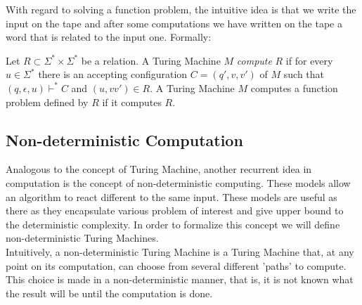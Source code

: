   With regard to solving a function problem, the intuitive idea is that we write the input on the tape and after some computations we have written on the tape a word that is related to the input one. Formally:


  \begin{definition}
    Let $R\subset\Sigma^*\times \Sigma^*$ be a relation. A Turing Machine $M$ \emph{compute} $R$ if for every $u\in \Sigma^*$ there is an accepting configuration $C=(q',v,v')$ of $M$  such that $(q,\epsilon,u)\vdash^* C$ and $(u,vv') \in R$. A Turing Machine $M$ computes a function problem defined by $R$ if it computes $R$.
  \end{definition}


  

  \subsection{Non-deterministic Computation}
Analogous to the concept of Turing Machine, another recurrent idea in computation is the concept of non-deterministic computing. These models allow an algorithm to react different to the same input. These models are useful as there as they encapsulate various problem of interest and give upper bound to the deterministic complexity. In order to formalize this concept we will define non-deterministic Turing Machines.\\

Intuitively, a non-deterministic Turing Machine is a Turing Machine that, at any point on its computation, can choose from several different 'paths' to compute. This choice is made in a non-deterministic manner, that is, it is not known what the result will be until the computation is done.

